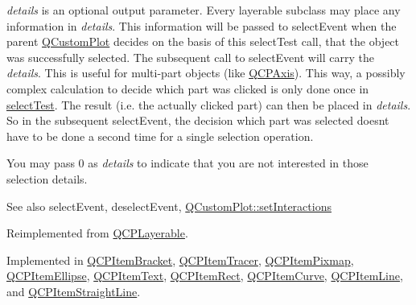 {\itshape details} is an optional output parameter. Every layerable subclass may place any information in {\itshape details}. This information will be passed to select\+Event when the parent \mbox{\hyperlink{class_q_custom_plot}{Q\+Custom\+Plot}} decides on the basis of this select\+Test call, that the object was successfully selected. The subsequent call to select\+Event will carry the {\itshape details}. This is useful for multi-\/part objects (like \mbox{\hyperlink{class_q_c_p_axis}{Q\+C\+P\+Axis}}). This way, a possibly complex calculation to decide which part was clicked is only done once in \mbox{\hyperlink{class_q_c_p_abstract_item_a96d522d10ffc0413b9a366c6f7f0476b}{select\+Test}}. The result (i.\+e. the actually clicked part) can then be placed in {\itshape details}. So in the subsequent select\+Event, the decision which part was selected doesn\textquotesingle{}t have to be done a second time for a single selection operation.

You may pass 0 as {\itshape details} to indicate that you are not interested in those selection details.

\begin{DoxySeeAlso}{See also}
select\+Event, deselect\+Event, \mbox{\hyperlink{class_q_custom_plot_a5ee1e2f6ae27419deca53e75907c27e5}{Q\+Custom\+Plot\+::set\+Interactions}} 
\end{DoxySeeAlso}


Reimplemented from \mbox{\hyperlink{class_q_c_p_layerable_a04db8351fefd44cfdb77958e75c6288e}{Q\+C\+P\+Layerable}}.



Implemented in \mbox{\hyperlink{class_q_c_p_item_bracket_a971299aa6fef75730d6f10efdaf48616}{Q\+C\+P\+Item\+Bracket}}, \mbox{\hyperlink{class_q_c_p_item_tracer_ae1dc728384936184e7552a6d0d67fd75}{Q\+C\+P\+Item\+Tracer}}, \mbox{\hyperlink{class_q_c_p_item_pixmap_a7583a98ebd3f35d2ac5d6c05fad25a6c}{Q\+C\+P\+Item\+Pixmap}}, \mbox{\hyperlink{class_q_c_p_item_ellipse_aa41be2180b2ace2e303b88d005c14243}{Q\+C\+P\+Item\+Ellipse}}, \mbox{\hyperlink{class_q_c_p_item_text_aca74494fd5e769f331a6eb3e29f32916}{Q\+C\+P\+Item\+Text}}, \mbox{\hyperlink{class_q_c_p_item_rect_abe1a6091591d3bad5e4efab2331f99ec}{Q\+C\+P\+Item\+Rect}}, \mbox{\hyperlink{class_q_c_p_item_curve_a8018b8b3fc552a44ba87ca4b64c1523f}{Q\+C\+P\+Item\+Curve}}, \mbox{\hyperlink{class_q_c_p_item_line_ae6cc5183f568e5fa9d7827abe4d405b5}{Q\+C\+P\+Item\+Line}}, and \mbox{\hyperlink{class_q_c_p_item_straight_line_a1e5d99d79efb5871600c72bcd2891a0f}{Q\+C\+P\+Item\+Straight\+Line}}.

